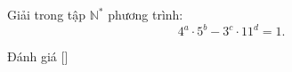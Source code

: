 \ifshowproblem
\begin{problem}\label{problem:ROU-2015-JBMO-TST-D4-P2}
    Giải trong tập \( \mathbb{N}^* \) phương trình:
    \[
        4^a \cdot 5^b - 3^c \cdot 11^d = 1.
    \]    
\end{problem}
\fi

\ifshowinfo
Đánh giá [\textbf{}]\footnotemark
{}
\fi
